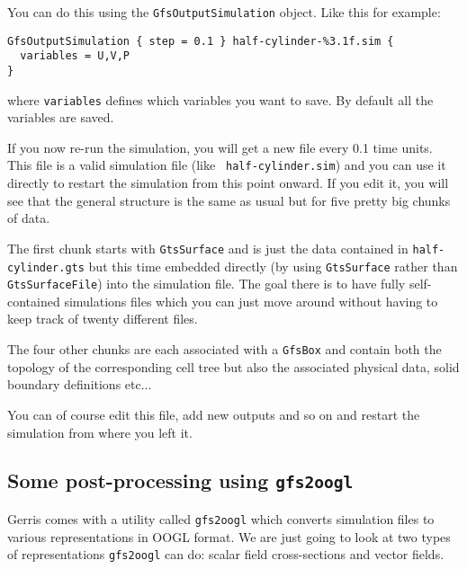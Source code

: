 \documentclass[a4paper]{article}
\begin{document}
You can do this using the {\tt GfsOutputSimulation} object. Like this
for example:
\begin{verbatim}
GfsOutputSimulation { step = 0.1 } half-cylinder-%3.1f.sim {
  variables = U,V,P
}
\end{verbatim}
where {\tt variables} defines which variables you want to save. By
default all the variables are saved.

If you now re-run the simulation, you will get a new file every 0.1
time units. This file is a valid simulation file (like {\tt
half-cylinder.sim}) and you can use it directly to restart the
simulation from this point onward. If you edit it, you will see that
the general structure is the same as usual but for five pretty big
chunks of data. 

The first chunk starts with {\tt GtsSurface} and is
just the data contained in {\tt half-cylinder.gts} but this time
embedded directly (by using {\tt GtsSurface} rather than {\tt
GtsSurfaceFile}) into the simulation file. The goal there is to have
fully self-contained simulations files which you can just move around
without having to keep track of twenty different files.

The four other chunks are each associated with a {\tt GfsBox} and
contain both the topology of the corresponding cell tree but also the
associated physical data, solid boundary definitions etc...

You can of course edit this file, add new outputs and so on and
restart the simulation from where you left it.

\subsection{Some post-processing using {\tt gfs2oogl}}

Gerris comes with a utility called {\tt gfs2oogl} which converts
simulation files to various representations in {\sc OOGL} format. We are
just going to look at two types of representations {\tt gfs2oogl} can
do: scalar field cross-sections and vector fields.
\end{document}
